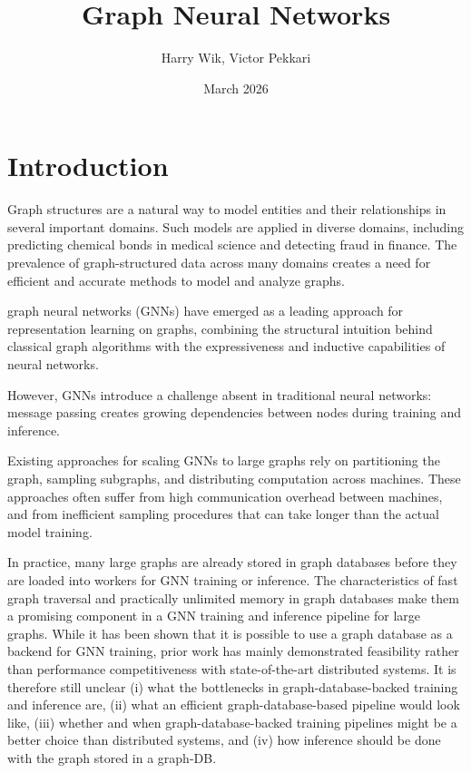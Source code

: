 \documentclass[ oneside,openright,titlepage,numbers=noenddot,headinclude,%
                footinclude=true,cleardoublepage=empty,abstractoff, %
                BCOR=0mm,paper=a4,fontsize=11pt,%
                ngerman,american,%
                ]{scrreprt}
\title{Graph Neural Networks}
\author{Harry Wik, Victor Pekkari}
\date{March 2026}
\begin{document}
\maketitle


\newpage
\tableofcontents
\newpage



\chapter{Introduction}


Graph structures are a natural way to model entities and their relationships in several important domains. Such models are applied in diverse domains, including predicting chemical bonds in medical science and detecting fraud in finance. The prevalence of graph-structured data across many domains creates a need for efficient and accurate methods to model and analyze graphs.

graph neural networks (GNNs) have emerged as a leading approach for representation learning on graphs, combining the structural intuition behind classical
graph algorithms with the expressiveness and inductive capabilities of neural networks. 

However, GNNs introduce a challenge absent in traditional neural networks: message passing creates growing dependencies between nodes during training and inference.

Existing approaches for scaling GNNs to large graphs rely on partitioning the graph, sampling subgraphs, and distributing computation across machines. These approaches often suffer from high communication overhead between machines, and from inefficient sampling procedures that can take longer than the actual model training.

In practice, many large graphs are already stored in graph databases before they are loaded into workers for GNN training or inference. The characteristics of fast graph traversal and practically unlimited memory in graph databases make them a promising component in a GNN training and inference pipeline for large graphs. While it has been shown that it is possible to use a graph database as a backend for GNN training, prior work has mainly demonstrated feasibility rather than performance competitiveness with state-of-the-art distributed systems. It is therefore still unclear (i) what the bottlenecks in graph-database-backed training and inference are, (ii) what an efficient graph-database-based pipeline would look like, (iii) whether and when graph-database-backed training pipelines might be a better choice than distributed systems, and (iv) how inference should be done with the graph stored in a graph-DB.
\end{document}
